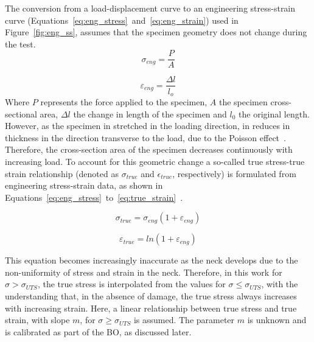 \documentclass[preprint, review, 12pt]{elsarticle}
\begin{document}
	The conversion from a load-displacement curve to an engineering stress-strain curve (Equations~\ref{eq:eng_stress}~and~\ref{eq:eng_strain}) used in Figure~\ref{fig:eng_ss}, assumes that the specimen geometry does not change during the test.
		\begin{equation}
		\sigma_{eng} = \frac{P}{A}
		\label{eq:eng_stress}
	\end{equation}

	\begin{equation}
		\varepsilon_{eng} = \frac{\Delta l}{l_o}
		\label{eq:eng_strain}
	\end{equation}
	Where $P$ represents the force applied to the specimen, $A$ the specimen cross-sectional area, $\Delta l$ the change in length of the specimen and $l_0$ the original length.
	However, as the specimen in stretched in the loading direction, in reduces in thickness in the direction transverse to the load, due to the Poisson effect~\cite{YOUNG2001}.
	Therefore, the cross-section area of the specimen decreases continuously with increasing load.
	To account for this geometric change a so-called true stress-true strain relationship (denoted as $\sigma_{true}$ and $\epsilon_{true}$, respectively) is formulated from engineering stress-strain data, as shown in Equations~\ref{eq:eng_stress}~to~\ref{eq:true_strain}~\cite{YOUNG2001}.

	\begin{equation}
		\sigma_{true} = \sigma_{eng} \left( 1 + \varepsilon_{eng} \right)
		\label{eq:true_stress}
	\end{equation}

	\begin{equation}
		\varepsilon_{true} = ln\left( 1 + \varepsilon_{eng} \right)
		\label{eq:true_strain}
	\end{equation}

	This equation becomes increasingly inaccurate as the neck develops due to the non-uniformity of stress and strain in the neck.
	Therefore, in this work for $\sigma > \sigma_{UTS}$, the true stress is interpolated from the values for $\sigma \leq \sigma_{UTS}$, with the understanding that, in the absence of damage, the true stress always increases with increasing strain.
	Here, a linear relationship between true stress and true strain, with slope $m$, for $\sigma \ge \sigma_{UTS}$ is assumed.
	The parameter $m$ is unknown and is calibrated as part of the BO, as discussed later.
\end{document}
